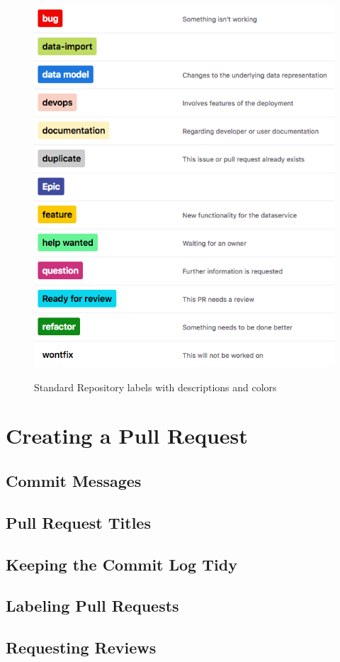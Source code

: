 \documentclass[a4paper,12pt,titlepage]{scrartcl}
\begin{document}
    \begin{figure}
    		\centering
    		\includegraphics[width=0.6\linewidth]{images/labels.png}
    		\label{fig:labels}
    		\caption{Standard Repository labels with descriptions and colors}
    \end{figure}
	
   
	\section{Creating a Pull Request}
	
	\subsection{Commit Messages}
	
	\subsection{Pull Request Titles}
	
	\subsection{Keeping the Commit Log Tidy}
	
	\subsection{Labeling Pull Requests}
	
	\subsection{Requesting Reviews}
   
\end{document}
